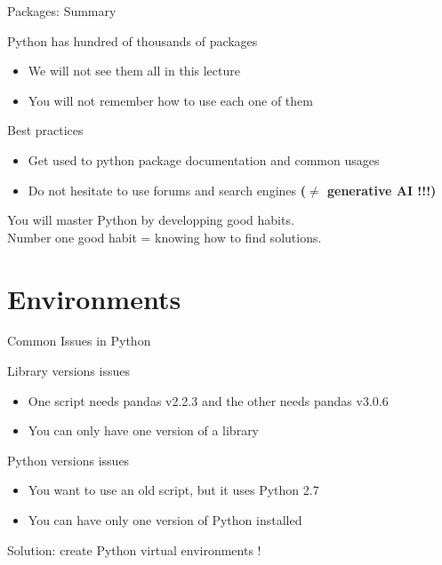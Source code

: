 \documentclass[serif, aspectratio=169]{beamer}
\begin{document}
\begin{frame}{Packages: Summary}
    \begin{block}{Python has hundred of thousands of packages}
        \begin{itemize}
            \item We will not see them all in this lecture
            \item You will not remember how to use each one of them
        \end{itemize}
    \end{block}
    \begin{block}{Best practices}
        \begin{itemize}
            \item Get used to python package documentation and common usages
            \item Do not hesitate to use forums and search engines \textbf{($\ne$ generative AI !!!)}
        \end{itemize}
    \end{block}
    \vfill
    \begin{center}
        \Large
        You will master Python by developping good habits. \\
        Number one good habit = knowing how to find solutions.
    \end{center}
\end{frame}

\section{Environments}

\begin{frame}{Common Issues in Python}
    \begin{block}{Library versions issues}
        \begin{itemize}
            \item One script needs pandas v2.2.3 and the other needs pandas v3.0.6
            \item You can only have one version of a library
        \end{itemize}
    \end{block}
    \begin{block}{Python versions issues}
        \begin{itemize}
            \item You want to use an old script, but it uses Python 2.7
            \item You can have only one version of Python installed
        \end{itemize}
    \end{block}
    \vfill
    \begin{center}
        \Large
        Solution: create Python virtual environments !
    \end{center}
\end{frame}
\end{document}
